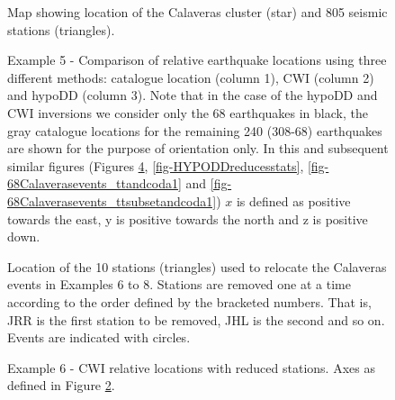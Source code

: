 \documentclass[12pt,double]{article}
\begin{document}

\begin{figure}
\caption{Map
showing location of the Calaveras cluster (star) and 805
seismic stations (triangles).}
\label{fig:-eqopti-California-Calaveras}
\end{figure}


\begin{figure}
\caption{Example 5 - Comparison of relative earthquake locations
using three different methods: catalogue location (column 1), CWI
(column 2) and hypoDD (column 3). Note that in the case of the
hypoDD and CWI inversions we consider only the 68 earthquakes in
black, the gray catalogue locations for the remaining 240 (308-68)
earthquakes are shown for the purpose of orientation only. In this and subsequent
similar figures (Figures \ref{fig-CWIreducesstats}, \ref{fig-HYPODDreducesstats},
\ref{fig-68Calaverasevents_ttandcoda1} and \ref{fig-68Calaverasevents_ttsubsetandcoda1}) 
$x$ is defined as positive towards the east, y is positive towards the north and z is 
positive down.}
\label{fig-69Calaverasevents_eg1}
\end{figure}

\begin{figure}
\caption{Location
of the 10 stations (triangles) used to relocate the Calaveras events
in Examples 6 to 8. Stations are removed one at a time according to
the order defined by the bracketed numbers. That is, JRR is the first station to 
be removed, JHL is the second and so on. Events are indicated with circles.}
\label{fig:-eqopti-Calaveras-substations}
\end{figure}


\begin{figure}
\caption{Example 6 - CWI relative locations with reduced stations. 
Axes as defined in Figure \ref{fig-69Calaverasevents_eg1}.
\hspace{20em}}
\label{fig-CWIreducesstats}
\end{figure}
\end{document}
